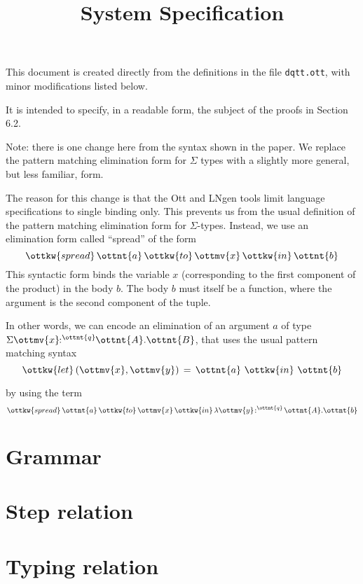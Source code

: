 \documentclass{article}
\title{System Specification}
\begin{document}
\maketitle

This document is created directly from the definitions in the file
{\texttt{dqtt.ott}}, with minor modifications listed below.

It is intended to specify, in a readable form, the subject of the proofs in
Section 6.2.

Note: there is one change here from the syntax shown in the paper. We replace
the pattern matching elimination form for $\Sigma$ types with a slightly more
general, but less familiar, form.

The reason for this change is that the Ott and LNgen tools limit language
specifications to single binding only. This prevents us from the usual
definition of the pattern matching elimination form for
$\Sigma$-types. Instead, we use an elimination form called ``spread'' of the
form
\[
 \ottkw{spread}\,  \ottnt{a} \, \ottkw{to}\,  \ottmv{x} \, \ottkw{in}\,  \ottnt{b}
\]
This syntactic form binds the variable $x$ (corresponding to the first
component of the product) in the body $b$. The body $b$ must itself be a
function, where the argument is the second component of the tuple.

In other words, we can encode an elimination of an argument $a$
of type $ \Sigma  \ottmv{x} \!\!:^ \ottnt{q} \!\! \ottnt{A} . \ottnt{B} $, that uses
the usual pattern matching syntax
\[ 
     \ottkw{let}\, (\ottmv{x},\ottmv{y}) \,=\, \ottnt{a} \ \ottkw{in}\  \ottnt{b} 
\] 

by using the term
\[
   \ottkw{spread}\,  \ottnt{a} \, \ottkw{to}\,  \ottmv{x} \, \ottkw{in}\,  \lambda \ottmv{y} \!:^ \ottnt{q} \! \ottnt{A} . \ottnt{b}
\]

\section{Grammar}

\ottgrammartabular{
\ottusage\ottinterrule
\otttm\ottinterrule
\ottcontext\ottinterrule
\ottD\ottafterlastrule
}


\section{Step relation}
\ottdefnsJOp{} 
\section{Typing relation}
\end{document}
